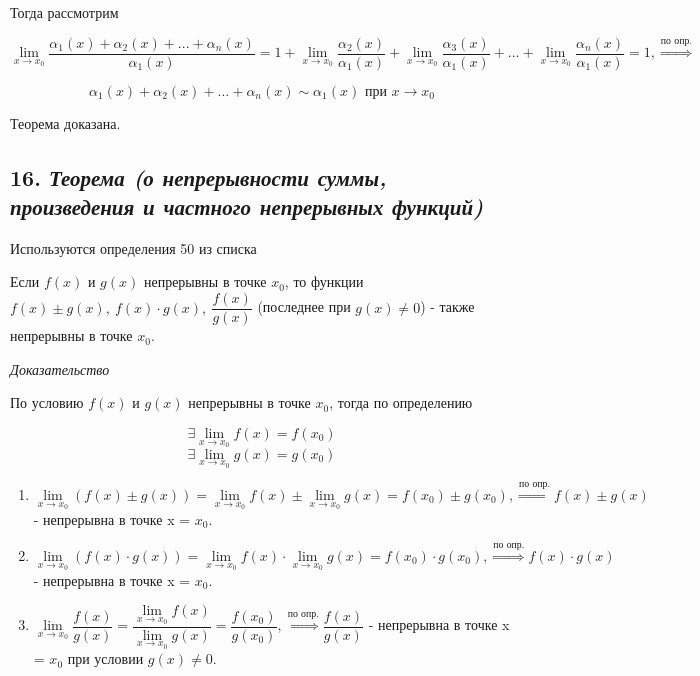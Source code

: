 Тогда рассмотрим

$$
\lim\limits_{x \to x_0}{\dfrac{\alpha_1(x) + \alpha_2(x) + ... +  \alpha_n(x)}{\alpha_1(x)}}= 1 + \lim\limits_{x \to x_0}\dfrac{\alpha_2(x)}{\alpha_1(x)} + \lim\limits_{x \to x_0}\dfrac{\alpha_3(x)}{\alpha_1(x)}+ ... + \lim\limits_{x \to x_0}\dfrac{\alpha_n(x)}{\alpha_1(x)} = 1, \overset{\text{по опр.}}\Rightarrow
$$

$$
\alpha_1(x) + \alpha_2(x) + ... +  \alpha_n(x) \sim \alpha_1(x) \text{ при } x \rightarrow x_0
$$

Теорема доказана.
\newpage 
\subsection*{16. \textit{Теорема (о непрерывности суммы, произведения и частного непрерывных функций)}}
\begin{Quote2} 
\small\centering 

Используются определения 50 из списка \end{Quote2} 

Если $f(x)$ и $g(x)$ непрерывны в точке $x_0$, то функции $f(x) \pm g(x),\ f(x)\cdot g(x), \ {\dfrac{f(x)}{g(x)}}$ (последнее при $g(x) \neq 0$) - также непрерывны в точке $x_0$.
\vspace*{20pt} 

\textit{Доказательство}

По условию $f(x)$ и $g(x)$ непрерывны в точке $x_0$, тогда по определению

$$\exists\lim\limits_{x \to x_0}f(x) = f(x_0)$$ $$\exists\lim\limits_{x \to x_0}g(x) = g(x_0)$$
\begin{enumerate}

\item $\lim\limits_{x \to x_0}(f(x) \pm g(x)) = \lim\limits_{x \to x_0}f(x) \pm \lim\limits_{x \to x_0}g(x) = f(x_0) \pm g(x_0), \overset{\text{по опр.}}\Rightarrow f(x) \pm g(x)$ - непрерывна в точке x = $x_0$.
\item $\lim\limits_{x \to x_0}(f(x) \cdot g(x)) = \lim\limits_{x \to x_0}f(x) \cdot \lim\limits_{x \to x_0}g(x) = f(x_0) \cdot g(x_0), \overset{\text{по опр.}}\Rightarrow f(x) \cdot g(x)$ - непрерывна в точке x = $x_0$.
\item $\lim\limits_{x \to x_0}{\dfrac{f(x)}{g(x)}} = {\dfrac{\lim\limits_{x \to x_0}f(x)} {\lim\limits_{x \to x_0}g(x)}} = {\dfrac{f(x_0)}{g(x_0)}}, \overset{\text{по опр.}}\Rightarrow {\dfrac{f(x)}{g(x)}}$ - непрерывна в точке x = $x_0$ при условии $g(x) \neq 0$.

\end{enumerate}

